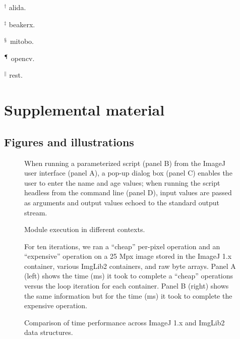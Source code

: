 \documentclass{bmcart}
\begin{document}
\begin{backmatter}
\begin{table}[h!]
\begin{flushleft}
      $^\dagger$ \acrfull{alida}.

      $^\ddagger$ \acrfull{beakerx}.

      $^\mathsection$ \acrfull{mitobo}.

      $^\mathparagraph$ \acrfull{opencv}.

      $^\|$ \acrfull{rest}.
    \end{flushleft}
  \end{table}

\FloatBarrier

\section*{Supplemental material}

\subsection*{Figures and illustrations}
  \renewcommand\thefigure{S.\arabic{figure}}
  \setcounter{figure}{0}

  \begin{figure}[h!]
    \caption{Module execution in different contexts.}
    \begin{flushleft}
      When running a parameterized script (panel B) from the ImageJ user
      interface (panel A), a pop-up dialog box (panel C) enables the user to
      enter the name and age values; when running the script headless from the
      command line (panel D), input values are passed as arguments and output
      values echoed to the standard output stream.
    \end{flushleft}
  \end{figure}

  \begin{figure}[h!]
    \caption{Comparison of time performance across ImageJ 1.x and ImgLib2 data
    structures.}
    \begin{flushleft}
      For ten iterations, we ran a ``cheap'' per-pixel operation and an
      ``expensive'' operation on a 25 Mpx image stored in the ImageJ 1.x
      container, various ImgLib2 containers, and raw byte arrays. Panel A
      (left) shows the time (ms) it took to complete a ``cheap'' operations
      versus the loop iteration for each container. Panel B (right) shows the
      same information but for the time (ms) it took to complete the expensive
      operation.
    \end{flushleft}
  \end{figure}


\end{backmatter}
\end{document}
